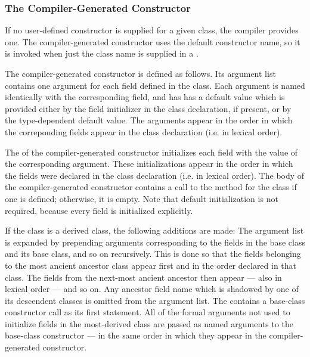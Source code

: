 \subsubsection{The Compiler-Generated Constructor}
\label{The_Compiler_Generated_Constructor}

If no user-defined constructor is supplied for a given class, the compiler
provides one.  The compiler-generated constructor uses the default constructor
name, so it is invoked when just the class name is supplied in
a .  

The compiler-generated constructor is defined as follows.  Its argument list
contains one argument for each field defined in the class.  Each argument is
named identically with the corresponding field, and has has a default value
which is provided either by the field initializer in the class declaration, if
present, or by the type-dependent default value.  The arguments appear in the
order in which the correponding fields appear in the class declaration (i.e. in
lexical order).

The  of the compiler-generated
constructor initializes each field with the value of the corresponding
argument.  These initializations appear in the order in which the fields were
declared in the class declaration (i.e. in lexical order).  The body of the
compiler-generated constructor contains a call to the  method
for the class if one is defined; otherwise, it is empty.  Note that default
initialization is not required, because every field is initialized explicitly.

If the class is a derived class, the following additions are made: The argument
list is expanded by prepending arguments corresponding to the fields in the base
class and its base class, and so on recursively.  This is done so that the
fields belonging to the most ancient ancestor class appear first and in the
order declared in that class.  The fields from the next-most ancient ancestor
then appear --- also in lexical order --- and so on.  Any ancestor field name
which is shadowed by one of its descendent classes is omitted from the argument
list.  The  contains a base-class constructor call
as its first statement.  All of the formal arguments not used to initialize
fields in the most-derived class are passed as named arguments to the
base-class constructor --- in the same order in which they appear in the
compiler-generated constructor.

